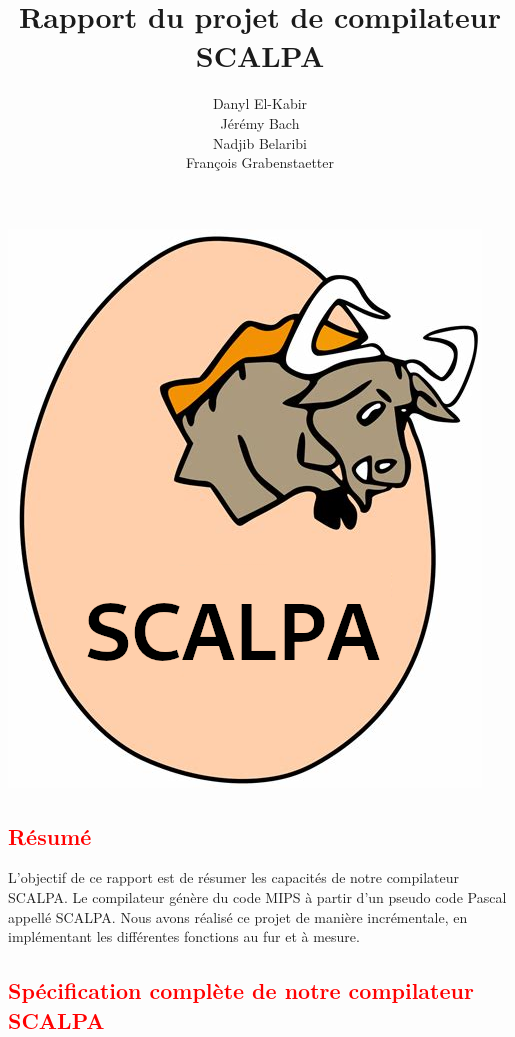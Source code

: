 \documentclass[a4paper]{article}
\title{Rapport du projet de compilateur SCALPA}
\author{Danyl El-Kabir\\Jérémy Bach\\Nadjib Belaribi\\François Grabenstaetter}
\newcommand{\csection}[1]{\textcolor{red}{\section{#1}}}
\begin{document}
\sffamily
\everymath{\displaystyle}
\setlength\parindent{0mm}
\setlength{\parskip}{0.2cm}
\maketitle

\begin{center}
    \includegraphics[scale=0.8]{img/scalpa.png}
\end{center}

\newpage
\tableofcontents
\newpage

\csection{Résumé}

L'objectif de ce rapport est de résumer les capacités de notre compilateur SCALPA. Le compilateur génère du code MIPS à partir d'un pseudo code Pascal appellé SCALPA. Nous avons réalisé ce projet de manière incrémentale, en implémentant les différentes fonctions au fur et à mesure.

\csection{Spécification complète de notre compilateur SCALPA}
\end{document}
